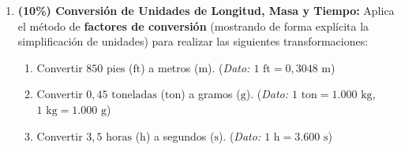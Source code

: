 \documentclass[11pt, letterpaper]{article}
\newif\ifshowanswers
\newcommand{\answer}[1]{
	\ifshowanswers
	\par\vspace{0.15cm}
	\begin{tcolorbox}[colback=blue!5!white, colframe=blue!60!white, arc=1mm, boxrule=0.5pt, title=\textbf{\footnotesize SOLUCIÓN PASO A PASO (DOCENTE)}]
		\color{blue!80!black}\footnotesize #1
	\end{tcolorbox}
	\par\vspace{0.15cm}
	\else
	\par\vspace{0.3cm}
	\fi
}
\begin{document}
\begin{enumerate}[leftmargin=*, itemsep=0.8cm]
		\answer{
			\textbf{Soluciones con prefijos del SI:}
			\begin{itemize}[itemsep=0.15cm]
				\item a) Giga ($\text{G}$) equivale a $10^9$. Por tanto: $5,4\text{ GHz} = \mathbf{5,4 \times 10^9\text{ Hz}}$ ($5.400.000.000\text{ Hz}$).
				\item b) Micro ($\mu$) equivale a $10^{-6}$. Por tanto: $8\ \mu\text{m} = \mathbf{8 \times 10^{-6}\text{ m}}$ ($0,000008\text{ m}$).
				\item c) Tera ($\text{T}$) equivale a $10^{12}$. Por tanto: $2\text{ TB} = \mathbf{2 \times 10^{12}\text{ B}}$ ($2.000.000.000.000\text{ Bytes}$).
			\end{itemize}
		}
		
		\item \textbf{(10\%) Conversión de Unidades de Longitud, Masa y Tiempo:} 
		Aplica el método de \textbf{factores de conversión} (mostrando de forma explícita la simplificación de unidades) para realizar las siguientes transformaciones:
		\begin{enumerate}[label=\alph*), itemsep=0.2cm]
			\item Convertir $850\text{ pies}$ ($\text{ft}$) a metros ($\text{m}$). \quad (\textit{Dato: $1\text{ ft} = 0,3048\text{ m}$})
			\item Convertir $0,45\text{ toneladas}$ ($\text{ton}$) a gramos ($\text{g}$). \quad (\textit{Dato: $1\text{ ton} = 1.000\text{ kg}$, $1\text{ kg} = 1.000\text{ g}$})
			\item Convertir $3,5\text{ horas}$ ($\text{h}$) a segundos ($\text{s}$). \quad (\textit{Dato: $1\text{ h} = 3.600\text{ s}$})
		\end{enumerate}
		
		\answer{
			\textbf{Desarrollo paso a paso por factores de conversión:}
			\begin{itemize}[itemsep=0.2cm]
				\item a) $850\text{ ft} \times \left(\frac{0,3048\text{ m}}{1\text{ ft}}\right) = 850 \times 0,3048 = \mathbf{259,08\text{ m}}$.
				\item b) $0,45\text{ ton} \times \left(\frac{1.000\text{ kg}}{1\text{ ton}}\right) \times \left(\frac{1.000\text{ g}}{1\text{ kg}}\right) = 0,45 \times 10^6 = \mathbf{450.000\text{ g}}$ ($4,5 \times 10^5\text{ g}$).
				\item c) $3,5\text{ h} \times \left(\frac{3.600\text{ s}}{1\text{ h}}\right) = 3,5 \times 3.600 = \mathbf{12.600\text{ s}}$.
			\end{itemize}
		}
		

\end{enumerate}
\end{document}
